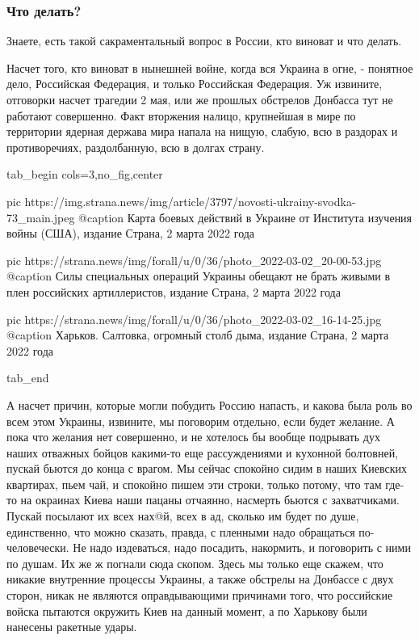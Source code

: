  
 
 
 
 
\subsubsection{Что делать?}

Знаете, есть такой сакраментальный вопрос в России, кто виноват и что делать.

Насчет того, кто виноват в нынешней войне, когда вся Украина в огне, - понятное
дело, Российская Федерация, и только Российская Федерация. Уж извините,
отговорки насчет трагедии 2 мая, или же прошлых обстрелов Донбасса тут не
работают совершенно. Факт вторжения налицо, крупнейшая в мире по территории
ядерная держава мира напала на нищую, слабую, всю в раздорах и противоречиях,
раздолбанную, всю в долгах страну. 

\ifcmt
  tab_begin cols=3,no_fig,center

     pic https://img.strana.news/img/article/3797/novosti-ukrainy-svodka-73_main.jpeg
		 @caption Карта боевых действий в Украине от Института изучения войны (США), издание Страна, 2 марта 2022 года

		 pic https://strana.news/img/forall/u/0/36/photo_2022-03-02_20-00-53.jpg
		 @caption Силы специальных операций Украины обещают не брать живыми в плен российских артиллеристов, издание Страна, 2 марта 2022 года

		 pic https://strana.news/img/forall/u/0/36/photo_2022-03-02_16-14-25.jpg
		 @caption Харьков. Салтовка, огромный столб дыма, издание Страна, 2 марта 2022 года

  tab_end
\fi

А насчет причин, которые могли побудить Россию напасть, и какова была роль во
всем этом Украины, извините, мы поговорим отдельно, если будет желание. А пока
что желания нет совершенно, и не хотелось бы вообще подрывать дух наших
отважных бойцов какими-то еще рассуждениями и кухонной болтовней, пускай бьются
до конца с врагом.  Мы сейчас спокойно сидим в наших Киевских квартирах, пьем
чай, и спокойно пишем эти строки, только потому, что там где-то на окраинах
Киева наши пацаны отчаянно, насмерть бьются с захватчиками. Пускай посылают их
всех нах@й, всех в ад, сколько им будет по душе, единственно, что можно
сказать, правда, с пленными надо обращаться по-человечески. Не надо издеваться,
надо посадить, накормить, и поговорить с ними по душам. Их же ж погнали сюда
скопом. Здесь мы только еще скажем, что никакие внутренние процессы Украины, а
также обстрелы на Донбассе с двух сторон, никак не являются оправдывающими
причинами того, что российские войска пытаются окружить Киев на данный момент,
а по Харькову были нанесены ракетные удары. 

